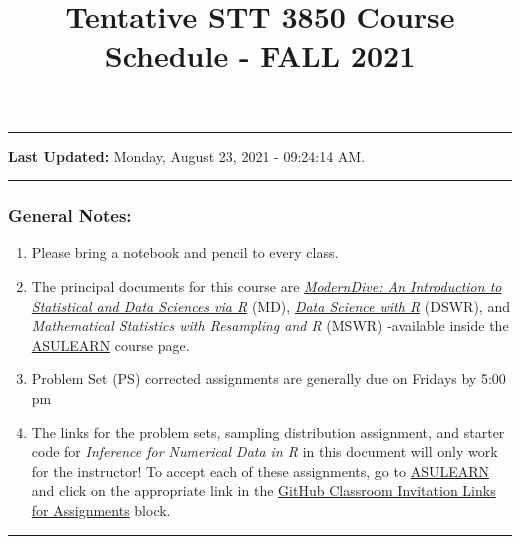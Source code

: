 \documentclass[
]{article}
\title{Tentative STT 3850 Course Schedule - FALL 2021}
\author{}
\date{\vspace{-2.5em}}
\providecommand{\tightlist}{%
  \setlength{\itemsep}{0pt}\setlength{\parskip}{0pt}}
\begin{document}
\maketitle

\begin{center}\rule{0.5\linewidth}{0.5pt}\end{center}

\textbf{Last Updated:} Monday, August 23, 2021 - 09:24:14 AM.

\begin{center}\rule{0.5\linewidth}{0.5pt}\end{center}

\hypertarget{general-notes}{%
\subsubsection*{General Notes:}\label{general-notes}}

\begin{rmdnote}
\begin{enumerate}
\def\labelenumi{\arabic{enumi}.}
\tightlist
\item
  Please bring a notebook and pencil to every class.
\item
  The principal documents for this course are
  \href{https://moderndive.com}{\emph{ModernDive: An Introduction to
  Statistical and Data Sciences via R}} (MD),
  \href{https://stat-ata-asu.github.io/R_DS_BD2020/}{\emph{Data Science
  with R}} (DSWR), and \emph{Mathematical Statistics with Resampling and
  R} (MSWR) -available inside the
  \href{https://asulearn.appstate.edu/course/view.php?id=131169}{ASULEARN}
  course page.
\item
  Problem Set (PS) corrected assignments are generally due on Fridays by
  5:00 pm
\item
  The links for the problem sets, sampling distribution assignment, and
  starter code for \emph{Inference for Numerical Data in R} in this
  document will only work for the instructor! To accept each of these
  assignments, go to
  \href{https://asulearn.appstate.edu/course/view.php?id=131169}{ASULEARN}
  and click on the appropriate link in the
  \href{https://asulearn.appstate.edu/course/view.php?id=131169}{GitHub
  Classroom Invitation Links for Assignments} block.
\end{enumerate}
\end{rmdnote}

\begin{center}\rule{0.5\linewidth}{0.5pt}\end{center}
\end{document}
